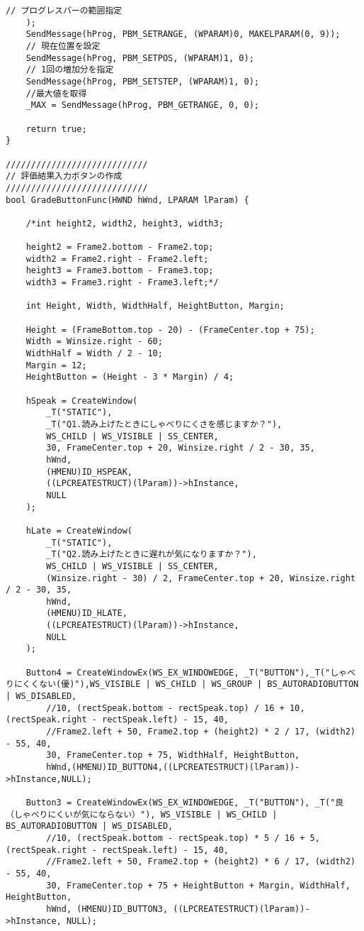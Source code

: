 \begin{lstlisting}[caption=window.cpp]
	// プログレスバーの範囲指定
	);
	SendMessage(hProg, PBM_SETRANGE, (WPARAM)0, MAKELPARAM(0, 9));
	// 現在位置を設定  
	SendMessage(hProg, PBM_SETPOS, (WPARAM)1, 0);
	// 1回の増加分を指定
	SendMessage(hProg, PBM_SETSTEP, (WPARAM)1, 0);
	//最大値を取得
	_MAX = SendMessage(hProg, PBM_GETRANGE, 0, 0);

	return true;
}

////////////////////////////
// 評価結果入力ボタンの作成
////////////////////////////
bool GradeButtonFunc(HWND hWnd, LPARAM lParam) {

	/*int height2, width2, height3, width3;

	height2 = Frame2.bottom - Frame2.top;
	width2 = Frame2.right - Frame2.left;
	height3 = Frame3.bottom - Frame3.top;
	width3 = Frame3.right - Frame3.left;*/

	int Height, Width, WidthHalf, HeightButton, Margin;

	Height = (FrameBottom.top - 20) - (FrameCenter.top + 75);
	Width = Winsize.right - 60;
	WidthHalf = Width / 2 - 10;
	Margin = 12;
	HeightButton = (Height - 3 * Margin) / 4;

	hSpeak = CreateWindow(
		_T("STATIC"),
		_T("Q1.読み上げたときにしゃべりにくさを感じますか？"),
		WS_CHILD | WS_VISIBLE | SS_CENTER,
		30, FrameCenter.top + 20, Winsize.right / 2 - 30, 35,
		hWnd,
		(HMENU)ID_HSPEAK,
		((LPCREATESTRUCT)(lParam))->hInstance,
		NULL
	);

	hLate = CreateWindow(
		_T("STATIC"),
		_T("Q2.読み上げたときに遅れが気になりますか？"),
		WS_CHILD | WS_VISIBLE | SS_CENTER,
		(Winsize.right - 30) / 2, FrameCenter.top + 20, Winsize.right / 2 - 30, 35,
		hWnd,
		(HMENU)ID_HLATE,
		((LPCREATESTRUCT)(lParam))->hInstance,
		NULL
	);

	Button4 = CreateWindowEx(WS_EX_WINDOWEDGE, _T("BUTTON"),_T("しゃべりにくくない(優)"),WS_VISIBLE | WS_CHILD | WS_GROUP | BS_AUTORADIOBUTTON | WS_DISABLED,
		//10, (rectSpeak.bottom - rectSpeak.top) / 16 + 10, (rectSpeak.right - rectSpeak.left) - 15, 40,
		//Frame2.left + 50, Frame2.top + (height2) * 2 / 17, (width2) - 55, 40,
		30, FrameCenter.top + 75, WidthHalf, HeightButton,
		hWnd,(HMENU)ID_BUTTON4,((LPCREATESTRUCT)(lParam))->hInstance,NULL);

	Button3 = CreateWindowEx(WS_EX_WINDOWEDGE, _T("BUTTON"), _T("良　（しゃべりにくいが気にならない）"), WS_VISIBLE | WS_CHILD | BS_AUTORADIOBUTTON | WS_DISABLED,
		//10, (rectSpeak.bottom - rectSpeak.top) * 5 / 16 + 5, (rectSpeak.right - rectSpeak.left) - 15, 40,
		//Frame2.left + 50, Frame2.top + (height2) * 6 / 17, (width2) - 55, 40,
		30, FrameCenter.top + 75 + HeightButton + Margin, WidthHalf, HeightButton,
		hWnd, (HMENU)ID_BUTTON3, ((LPCREATESTRUCT)(lParam))->hInstance, NULL);


\end{lstlisting}
